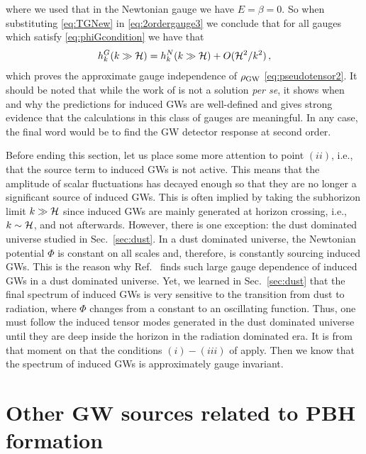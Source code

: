 \documentclass[a4paper,11pt]{article}
\numberwithin{equation}{section}
\begin{document}
where we used that in the Newtonian gauge we have $E=\beta=0$. So when substituting \eqref{eq:TGNew} in \eqref{eq:2ordergauge3} we conclude that for all gauges which satisfy \eqref{eq:phiGcondition} we have that
\begin{align}
h^G_{k}(k\gg{\cal H})=h^N_{k}(k\gg{\cal H})+O({\cal H}^2/k^2)\,,
\end{align}
which proves the approximate gauge independence of $\rho_{\rm GW}$ \eqref{eq:pseudotensor2}. It should be noted that while the work of \cite{Domenech:2020xin} is not a solution \textit{per se}, it shows when and why the predictions for induced GWs are well-defined and gives strong evidence that the calculations in this class of gauges are meaningful. In any case, the final word would be to find the GW detector response at second order.

Before ending this section, let us place some more attention to point $(ii)$, i.e., that the source term to induced GWs is not active. This means that the amplitude of scalar fluctuations has decayed enough so that they are no longer a significant source of induced GWs. This is often implied by taking the subhorizon limit $k\gg {\cal H}$ since induced GWs are mainly generated at horizon crossing, i.e., $k\sim {\cal H}$, and not afterwards. However, there is one exception: the dust dominated universe studied in Sec.~\ref{sec:dust}. In a dust dominated universe, the Newtonian potential $\Phi$ is constant on all scales and, therefore, is constantly sourcing induced GWs. This is the reason why Ref.~\cite{Hwang:2017oxa} finds such large gauge dependence of induced GWs in a dust dominated universe. Yet, we learned in Sec.~\ref{sec:dust} that the final spectrum of induced GWs is very sensitive to the transition from dust to radiation, where $\Phi$ changes from a constant to an oscillating function. Thus, one must follow the induced tensor modes generated in the dust dominated universe until they are deep inside the horizon in the radiation dominated era. It is from that moment on that the conditions $(i)-(iii)$ of \cite{Domenech:2020xin} apply. Then we know that the spectrum of induced GWs is approximately gauge invariant.





\section{Other GW sources related to PBH formation \label{sec:othersources}}
\end{document}
